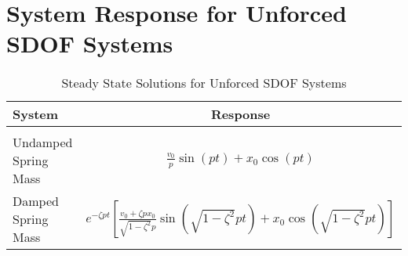 \section{System Response for Unforced SDOF Systems}
\begin{table}[h]
    \centering
    \caption{Steady State Solutions for Unforced SDOF Systems}
    \begin{tabular}{lc}
        \toprule
        System & Response \\
        \hline \\[-1ex]
        Undamped Spring Mass & \(\displaystyle \frac{v_0}{p}\sin(pt) + x_0\cos(pt)\) \\[3ex]
        Damped Spring Mass & \(\displaystyle e^{-\zeta pt}\left[\frac{v_0 + \zeta p x_0}{\sqrt{1 - \zeta^2}p}\sin(\sqrt{1 - \zeta^2}p t) + x_0 \cos(\sqrt{1 - \zeta^2} pt)\right]\) \\
        \bottomrule
    \end{tabular}
\end{table} 

